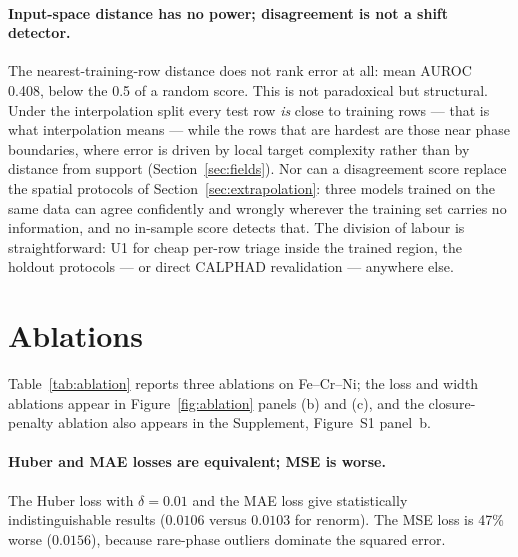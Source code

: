 \documentclass[preprint,12pt,authoryear]{elsarticle}
\begin{document}
\paragraph{Input-space distance has no power; disagreement is not a shift
detector.}
The nearest-training-row distance does not rank error at all: mean AUROC
0.408, below the 0.5 of a random score. This is not paradoxical but
structural. Under the interpolation split every test row \emph{is} close
to training rows --- that is what interpolation means --- while the rows
that are hardest are those near phase boundaries, where error is driven
by local target complexity rather than by distance from support
(Section~\ref{sec:fields}). Nor can a disagreement score replace the
spatial protocols of Section~\ref{sec:extrapolation}: three models trained
on the same data can agree confidently and wrongly wherever the training
set carries no information, and no in-sample score detects that. The
division of labour is straightforward: U1 for cheap per-row triage inside
the trained region, the holdout protocols --- or direct CALPHAD
revalidation --- anywhere else.

\section{Ablations}
\label{sec:ablations}

Table~\ref{tab:ablation} reports three ablations on Fe--Cr--Ni; the loss
and width ablations appear in Figure~\ref{fig:ablation} panels (b) and
(c), and the closure-penalty ablation also appears in the Supplement,
Figure~S1 panel~b.

\begin{table}[htbp]
\centering
\caption{Ablations on Fe--Cr--Ni (mean over three seeds; uncertainty in units
of the last digit). Loss function, hidden-layer width, and closure penalty
are varied for the renorm and sigmoid/$\Sigma$ heads.}
\label{tab:ablation}
\small

\end{table}

\paragraph{Huber and MAE losses are equivalent; MSE is worse.}
The Huber loss with $\delta = 0.01$ and the MAE loss give statistically
indistinguishable results ($0.0106$ versus $0.0103$ for renorm). The MSE
loss is 47\% worse ($0.0156$), because rare-phase outliers dominate the
squared error.
\end{document}
